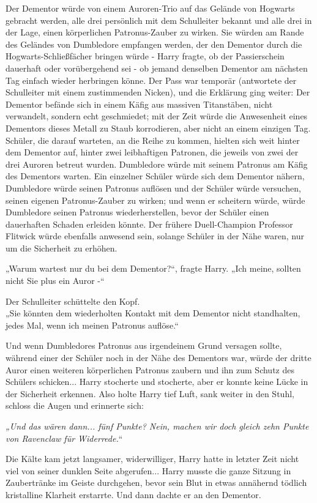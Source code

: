 {Der Dementor würde von einem Auroren-Trio auf das Gelände von Hogwarts gebracht werden, alle drei persönlich mit dem Schulleiter bekannt und alle drei in der Lage, einen körperlichen Patronus-Zauber zu wirken. Sie würden am Rande des Geländes von Dumbledore empfangen werden, der den Dementor durch die Hogwarts-Schließfächer bringen würde - Harry fragte, ob der Passierschein dauerhaft oder vorübergehend sei - ob jemand denselben Dementor am nächsten Tag einfach wieder herbringen könne. Der Pass war temporär (antwortete der Schulleiter mit einem zustimmenden Nicken), und die Erklärung ging weiter: Der Dementor befände sich in einem Käfig aus massiven Titanstäben, nicht verwandelt, sondern echt geschmiedet; mit der Zeit würde die Anwesenheit eines Dementors dieses Metall zu Staub korrodieren, aber nicht an einem einzigen Tag. Schüler, die darauf warteten, an die Reihe zu kommen, hielten sich weit hinter dem Dementor auf, hinter zwei leibhaftigen Patronen, die jeweils von zwei der drei Auroren betreut wurden. Dumbledore würde mit seinem Patronus am Käfig des Dementors warten. Ein einzelner Schüler würde sich dem Dementor nähern, Dumbledore würde seinen Patronus auflösen und der Schüler würde versuchen, seinen eigenen Patronus-Zauber zu wirken; und wenn er scheitern würde, würde Dumbledore seinen Patronus wiederherstellen, bevor der Schüler einen dauerhaften Schaden erleiden könnte. Der frühere Duell-Champion Professor Flitwick würde ebenfalls anwesend sein, solange Schüler in der Nähe waren, nur um die Sicherheit zu erhöhen.

„Warum wartest nur du bei dem Dementor?“, fragte Harry. „Ich meine, sollten nicht Sie plus ein Auror -“

Der Schulleiter schüttelte den Kopf.\\ „Sie könnten dem wiederholten Kontakt mit dem Dementor nicht standhalten, jedes Mal, wenn ich meinen Patronus auflöse.“

Und wenn Dumbledores Patronus aus irgendeinem Grund versagen sollte, während einer der Schüler noch in der Nähe des Dementors war, würde der dritte Auror einen weiteren körperlichen Patronus zaubern und ihn zum Schutz des Schülers schicken... Harry stocherte und stocherte, aber er konnte keine Lücke in der Sicherheit erkennen. Also holte Harry tief Luft, sank weiter in den Stuhl, schloss die Augen und erinnerte sich:

\emph{„Und das wären dann... fünf Punkte? Nein, machen wir doch gleich zehn Punkte von Ravenclaw für Widerrede.}“

Die Kälte kam jetzt langsamer, widerwilliger, Harry hatte in letzter Zeit nicht viel von seiner dunklen Seite abgerufen... Harry musste die ganze Sitzung in Zaubertränke im Geiste durchgehen, bevor sein Blut in etwas annähernd tödlich kristalline Klarheit erstarrte. Und dann dachte er an den Dementor.

}
